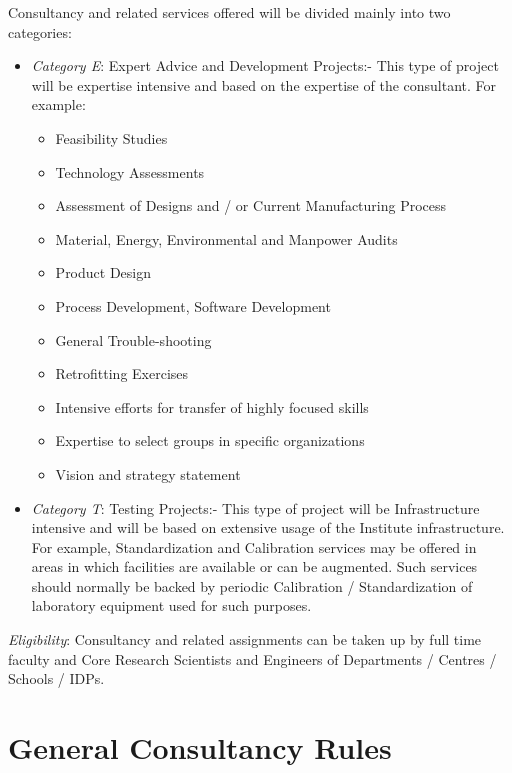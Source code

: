\documentclass[
  10pt,
  a5paper,
  10pt,
  openany]{amsbook}
\providecommand{\tightlist}{%
  \setlength{\itemsep}{0pt}\setlength{\parskip}{0pt}}
\begin{document}
Consultancy and related services offered will be divided mainly into two
categories:

\begin{itemize}
\item
  \emph{Category E}: Expert Advice and Development Projects:- This type
  of project will be expertise intensive and based on the expertise of
  the consultant. For example:

  \begin{itemize}
  \tightlist
  \item
    Feasibility Studies
  \item
    Technology Assessments
  \item
    Assessment of Designs and / or Current Manufacturing Process
  \item
    Material, Energy, Environmental and Manpower Audits
  \item
    Product Design
  \item
    Process Development, Software Development
  \item
    General Trouble-shooting
  \item
    Retrofitting Exercises
  \item
    Intensive efforts for transfer of highly focused skills
  \item
    Expertise to select groups in specific organizations
  \item
    Vision and strategy statement
  \end{itemize}
\item
  \emph{Category T}: Testing Projects:- This type of project will be
  Infrastructure intensive and will be based on extensive usage of the
  Institute infrastructure. For example, Standardization and Calibration
  services may be offered in areas in which facilities are available or
  can be augmented. Such services should normally be backed by periodic
  Calibration / Standardization of laboratory equipment used for such
  purposes.
\end{itemize}

\emph{Eligibility}: Consultancy and related assignments can be taken up
by full time faculty and Core Research Scientists and Engineers of
Departments / Centres / Schools / IDPs.

\section{General Consultancy Rules}\label{general-consultancy-rules}
\end{document}
